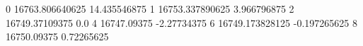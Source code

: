 0 16763.806640625 14.435546875
1 16753.337890625 3.966796875
2 16749.37109375 0.0
4 16747.09375 -2.27734375
6 16749.173828125 -0.197265625
8 16750.09375 0.72265625
